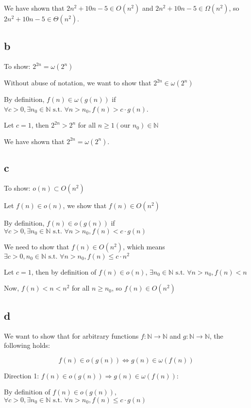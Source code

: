 \documentclass[a4paper,12pt]{article}
\begin{document}
We have shown that $2n^2 + 10n - 5 \in O(n^2)$ and $2n^2 + 10n - 5 \in \Omega(n^2)$, so $2n^2 + 10n - 5 \in \Theta(n^2)$.

\subsection{b}

To show: $2^{2n} = \omega(2^n)$

Without abuse of notation, we want to show that $2^{2n} \in \omega(2^n)$

By definition, $f(n) \in \omega(g(n))$ if $\forall c > 0, \exists n_0 \in \mathbb{N} \text{ s.t. } \forall n > n_0, f(n) > c \cdot g(n)$.

Let $c = 1$, then $2^{2n} > 2^n$ for all $n \geq 1 (\text{our } n_0)\in \mathbb{N}$

We have shown that $2^{2n} = \omega(2^n)$.

\subsection{c}

To show: $o(n) \subset O(n^2)$

Let $f(n) \in o(n)$, we show that $f(n) \in O(n^2)$

By definition, $f(n) \in o(g(n))$ if $\forall c > 0, \exists n_0 \in \mathbb{N} \text{ s.t. } \forall n > n_0, f(n) < c \cdot g(n)$

We need to show that $f(n) \in O(n^2)$, which means $\exists c > 0, n_0 \in \mathbb{N} \text{ s.t. } \forall n > n_0, f(n) \leq c \cdot n^2$

Let $c = 1$, then by definition of $f(n) \in o(n)$, $\exists n_0 \in \mathbb{N} \text{ s.t. } \forall n > n_0, f(n) < n$

Now, $f(n) < n < n^2$ for all $n \geq n_0$, so $f(n) \in O(n^2)$

\subsection{d}

We want to show that for arbitrary functions $f : \mathbb{N} \to \mathbb{N}$ and $g : \mathbb{N} \to \mathbb{N}$, the following holds:

$$f(n) \in o(g(n)) \Leftrightarrow g(n) \in \omega(f(n))$$

Direction 1: $f(n) \in o(g(n)) \Rightarrow g(n) \in \omega(f(n))$:

By definition of $f(n) \in o(g(n))$, $\forall c > 0, \exists n_0 \in \mathbb{N} \text{ s.t. } \forall n > n_0, f(n) \leq c \cdot g(n)$
\end{document}

